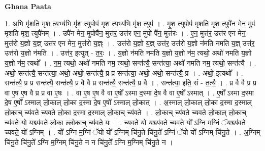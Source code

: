 \documentclass[17pt]{extarticle}
\begin{document}
\textbf{Ghana Paata } \newline

1. अ॒भि मृ॑शति मृश त्य॒भ्य॑भि मृ॑श॒ त्युपोप॑ मृश त्य॒भ्य॑भि मृ॑श॒ त्युप॑ । . मृ॒श॒ त्युपोप॑ मृशति मृश॒ त्युपै॑न मेन॒ मुप॑ मृशति मृश॒ त्युपै॑नम् । . उपै॑न मेन॒ मुपोपै॑न॒ मुत्त॑र॒ उत्त॑र एन॒ मुपो पै॑न॒ मुत्त॑रः । . ए॒न॒ मुत्त॑र॒ उत्त॑र एन मेन॒ मुत्त॑रो य॒ज्ञो य॒ज्ञ् उत्त॑र एन मेन॒ मुत्त॑रो य॒ज्ञ्ः । . उत्त॑रो य॒ज्ञो य॒ज्ञ् उत्त॑र॒ उत्त॑रो य॒ज्ञो न॑मति नमति य॒ज्ञ् उत्त॑र॒ उत्त॑रो य॒ज्ञो न॑मति । . उत्त॑र॒ इत्युत् - त॒रः॒ । . य॒ज्ञो न॑मति नमति य॒ज्ञो य॒ज्ञो न॑म॒ त्यथो॒ अथो॑ नमति य॒ज्ञो य॒ज्ञो न॑म॒ त्यथो᳚ । . न॒म॒ त्यथो॒ अथो॑ नमति नम॒ त्यथो॒ सन्त॑त्यै॒ सन्त॑त्या॒ अथो॑ नमति नम॒ त्यथो॒ सन्त॑त्यै । . अथो॒ सन्त॑त्यै॒ सन्त॑त्या॒ अथो॒ अथो॒ सन्त॑त्यै॒ प्र प्र सन्त॑त्या॒ अथो॒ अथो॒ सन्त॑त्यै॒ प्र । . अथो॒ इत्यथो᳚ । . सन्त॑त्यै॒ प्र प्र सन्त॑त्यै॒ सन्त॑त्यै॒ प्र वै वै प्र सन्त॑त्यै॒ सन्त॑त्यै॒ प्र वै । . सन्त॑त्या॒ इति॒ सं - त॒त्यै॒ । . प्र वै वै प्र प्र वा ए॒ष ए॒ष वै प्र प्र वा ए॒षः । . वा ए॒ष ए॒ष वै वा ए॒षो᳚ ऽस्मा द॒स्मा दे॒ष वै वा ए॒षो᳚ ऽस्मात् । . ए॒षो᳚ ऽस्मा द॒स्मा दे॒ष ए॒षो᳚ ऽस्माल् लो॒काल् लो॒का द॒स्मा दे॒ष ए॒षो᳚ ऽस्माल् लो॒कात् । . अ॒स्माल् लो॒काल् लो॒का द॒स्मा द॒स्माल् लो॒काच् च्य॑वते च्यवते लो॒का द॒स्मा द॒स्माल् लो॒काच् च्य॑वते । . लो॒काच् च्य॑वते च्यवते लो॒काल् लो॒काच् च्य॑वते॒ यो यश्च्य॑वते लो॒का ल्लो॒काच् च्य॑वते॒ यः । . च्य॒व॒ते॒ यो यश्च्य॑वते च्यवते॒ यो᳚ ऽग्नि म॒ग्निं ॅयश्च्य॑वते च्यवते॒ यो᳚ ऽग्निम् । . यो᳚ ऽग्नि म॒ग्निं ॅयो यो᳚ ऽग्निम् चि॑नु॒ते चि॑नु॒ते᳚ ऽग्निं ॅयो यो᳚ ऽग्निम् चि॑नु॒ते । . अ॒ग्निम् चि॑नु॒ते चि॑नु॒ते᳚ ऽग्नि म॒ग्निम् चि॑नु॒ते न न चि॑नु॒ते᳚ ऽग्नि म॒ग्निम् चि॑नु॒ते न । \newline
\end{document}
